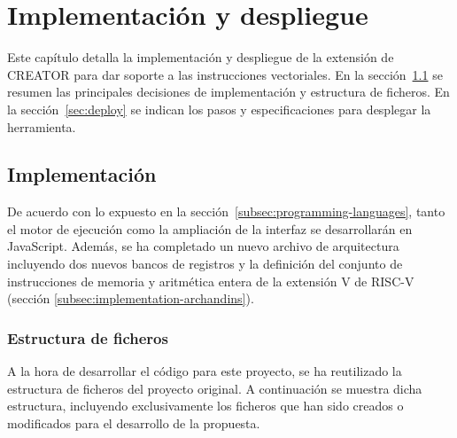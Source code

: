 \chapter{Implementación y despliegue}\label{chap:implementation}

Este capítulo detalla la implementación y despliegue de la extensión de CREATOR para dar soporte a las instrucciones vectoriales. En la sección~\ref{sec:implementation} se resumen las principales decisiones de implementación y estructura de ficheros. En la sección~\ref{sec:deploy} se indican los pasos y especificaciones para desplegar la herramienta\@.

\section{Implementación}\label{sec:implementation}
De acuerdo con lo expuesto en la sección~\ref{subsec:programming-languages}, tanto el motor de ejecución como la ampliación de la interfaz se desarrollarán en JavaScript. Además, se ha completado un nuevo archivo de arquitectura incluyendo dos nuevos bancos de registros y la definición del conjunto de instrucciones de memoria y aritmética entera de la extensión V de RISC-V (sección \ref{subsec:implementation-archandins})\@. 

\subsection{Estructura de ficheros}\label{subsec:file-structure}
A la hora de desarrollar el código para este proyecto, se ha reutilizado la estructura de ficheros del proyecto original. A continuación se muestra dicha estructura, incluyendo exclusivamente los ficheros que han sido creados o modificados para el desarrollo de la propuesta.

